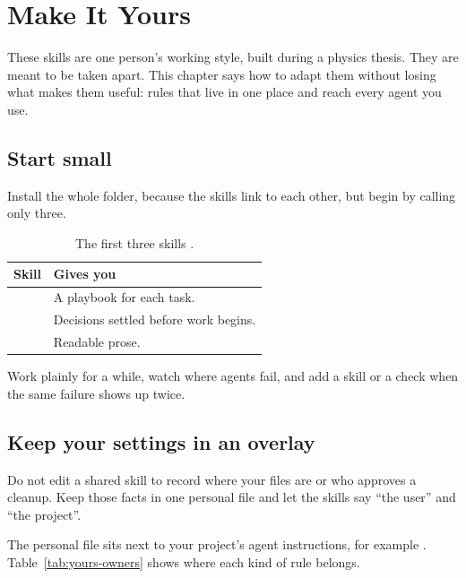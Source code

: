 \chapter{Make It Yours}\label{ch:yours}

These skills are one person's working style, built during a physics thesis. They are
meant to be taken apart. This chapter says how to adapt them without losing what makes
them useful: rules that live in one place and reach every agent you use.

\section{Start small}

\begin{headline}
  Install the whole  folder, because the skills link to each other, but
  begin by calling only three.
\end{headline}

\begin{table}[H]
  \small
  \begin{tabularx}{\textwidth}{L{0.24\textwidth}Y}
    \toprule
    Skill & Gives you \\
    \midrule
     & A playbook for each task. \\
     & Decisions settled before work begins. \\
     & Readable prose. \\
    \bottomrule
  \end{tabularx}
  \caption{The first three skills \cite[Make it yours]{pstack:guide}.}
  \label{tab:yours-start}
\end{table}

Work plainly for a while, watch where agents fail, and add a skill or a check when the
same failure shows up twice.

\section{Keep your settings in an overlay}

\begin{headline}
  Do not edit a shared skill to record where your files are or who approves a cleanup.
  Keep those facts in one personal file and let the skills say ``the user'' and ``the
  project''.
\end{headline}

The personal file sits next to your project's agent instructions, for example
. Table~\ref{tab:yours-owners} shows where each kind of rule belongs.

